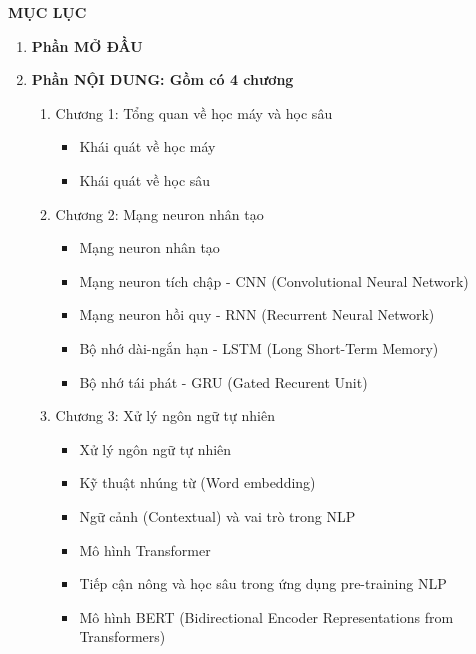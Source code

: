 
\begin{center}
    \textbf{MỤC LỤC}
\end{center}
\begin{enumerate}[label=\textbf{\arabic*.}]
    \item \textbf{Phần MỞ ĐẦU}
    \item \textbf{Phần NỘI DUNG: Gồm có 4 chương}
          \begin{enumerate}
              \item Chương 1: Tổng quan về học máy và học sâu
                    \begin{itemize}
                        \itemsep 0pt
                        \item Khái quát về học máy
                        \item Khái quát về học sâu
                    \end{itemize}
              \item Chương 2: Mạng neuron nhân tạo
                    \begin{itemize}
                        \item Mạng neuron nhân tạo
                        \item Mạng neuron tích chập - CNN (Convolutional Neural Network)
                        \item Mạng neuron hồi quy - RNN (Recurrent Neural Network)
                        \item Bộ nhớ dài-ngắn hạn - LSTM (Long Short-Term Memory)
                        \item Bộ nhớ tái phát - GRU (Gated Recurent Unit)
                    \end{itemize}
              \item Chương 3: Xử lý ngôn ngữ tự nhiên
                    \begin{itemize}
                        \item Xử lý ngôn ngữ tự nhiên
                        \item Kỹ thuật nhúng từ (Word embedding)
                        \item Ngữ cảnh (Contextual) và vai trò trong NLP
                        \item Mô hình Transformer
                        \item Tiếp cận nông và học sâu trong ứng dụng pre-training NLP
                        \item Mô hình BERT (Bidirectional Encoder Representations from Transformers)

\end{itemize}
\end{enumerate}
\end{enumerate}
